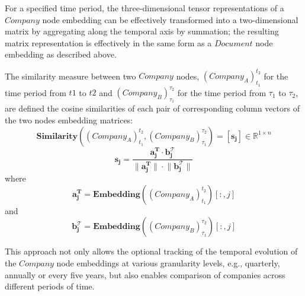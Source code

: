 \documentclass [
     12pt,         %
     a4paper,      %
     BCOR10mm,     %
     DIV14,        %
     liststotoc,   %
     bibtotoc,     %
     idxtotoc,     %
     parskip       %
     ]{scrreprt}
\begin{document}
For a specified time period, the three-dimensional tensor representations of a $Company$ node embedding can be effectively transformed into a two-dimensional matrix by aggregating along the temporal axis by summation; the resulting matrix representation is effectively in the same form as a $Document$ node embedding as described above. 

The similarity measure between two $Company$ nodes, $(Company_A)_{t_1}^{t_2}$ for the time period from $t1$ to $t2$ and $(Company_B)_{\tau_1}^{\tau_2}$ for the time period from ${\tau_1}$ to ${\tau_2}$, are defined the cosine similarities of each pair of corresponding column vectors of the two nodes embedding matrices:
\[ \mathbf{Similarity}((Company_A)_{t_1}^{t_2}, (Company_B)_{\tau_1}^{\tau_2}) = [ \mathbf{s_j} ] \in \mathbb{R}^{1 \times n}\]
\[  \mathbf{s_j} = \frac{\mathbf{a_j^{T} \cdot b_j^{\mathcal{T}}} } {\mathbf{\lVert a_j^{T} \rVert \cdot \lVert b_j^{\mathcal{T}} \rVert}} \] 
where 
\[\mathbf{a_j^{T}} = \textbf{Embedding}((Company_A)_{t_1}^{t_2})[: , j] \] 
and
\[\mathbf{b_j^{\mathcal{T}}} = \textbf{Embedding}((Company_B)_{\tau_1}^{\tau_2})[: , j] \]

This approach not only allows the optional tracking of the temporal evolution of the $Company$ node embeddings at various granularity levels, e.g., quarterly, annually or every five years, but also enables comparison of companies across different periods of time. 




%

\newpage



\end{document}
